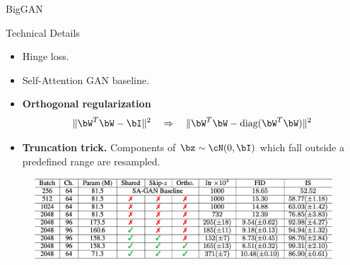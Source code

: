 \begin{frame}{BigGAN}
		\begin{block}{Technical Details}
			\begin{itemize}
				\item Hinge loss.
				\item Self-Attention GAN baseline.
				\item \textbf{Orthogonal regularization}
				\vspace{-0.2cm}
				\[
					\| \bW^T \bW - \bI \|^2 \quad \Rightarrow \quad \| \bW^T \bW - \text{diag}(\bW^T \bW) \|^2
				\]
				\vspace{-0.8cm}
				\item \textbf{Truncation trick.} Components of $\bz \sim \cN(0, \bI)$ which fall outside a predefined range are resampled.
			\end{itemize}
		\end{block}
	\begin{figure}
		\centering
		\includegraphics[width=\linewidth]{figs/biggan_results}
	\end{figure}
	
\end{frame}

